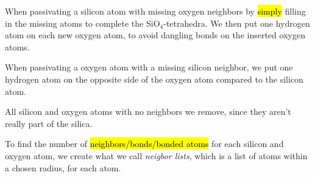 When passivating a silicon atom with missing oxygen neighbors by \hl{simply} filling in the missing atoms to complete the SiO$_4$-tetrahedra. We then put one hydrogen atom on each new oxygen atom, to avoid dangling bonds on the inserted oxygen atoms.

When passivating a oxygen atom with a missing silicon neighbor, we put one hydrogen atom on the opposite side of the oxygen atom compared to the silicon atom.

All silicon and oxygen atoms with no neighbors we remove, since they aren't really part of the silica.

To find the number of \hl{neighbors/bonds/bonded atoms} for each silicon and oxygen atom, we create what we call \emph{neigbor lists}, which is a list of atoms within a chosen radius, for each atom.

